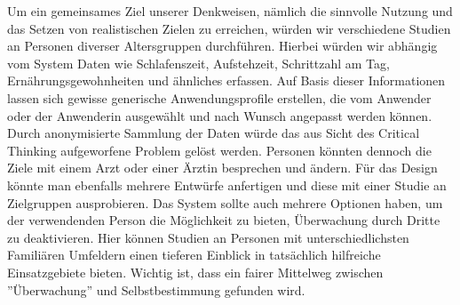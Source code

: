 \documentclass[sigchi-a, authorversion]{acmart}
\begin{document}
Um ein gemeinsames Ziel unserer Denkweisen, nämlich die sinnvolle Nutzung und das Setzen von realistischen Zielen zu erreichen, würden wir verschiedene Studien an Personen diverser Altersgruppen durchführen. Hierbei würden wir abhängig vom System Daten wie Schlafenszeit, Aufstehzeit, Schrittzahl am Tag, Ernährungsgewohnheiten und ähnliches erfassen. Auf Basis dieser Informationen lassen sich gewisse generische Anwendungsprofile erstellen, die vom Anwender oder der Anwenderin ausgewählt und nach Wunsch angepasst werden können. \\
Durch anonymisierte Sammlung der Daten würde das aus Sicht des Critical Thinking aufgeworfene Problem gelöst werden. Personen könnten dennoch die Ziele mit einem Arzt oder einer Ärztin besprechen und ändern. Für das Design könnte man ebenfalls mehrere Entwürfe anfertigen und diese mit einer Studie an Zielgruppen ausprobieren. Das System sollte auch mehrere Optionen haben, um der verwendenden Person die Möglichkeit zu bieten, Überwachung durch Dritte zu deaktivieren. Hier können Studien an Personen mit unterschiedlichsten Familiären Umfeldern einen tieferen Einblick in tatsächlich hilfreiche Einsatzgebiete bieten. Wichtig ist, dass ein fairer Mittelweg zwischen ''Überwachung'' und Selbstbestimmung gefunden wird.


\newpage


\end{document}

